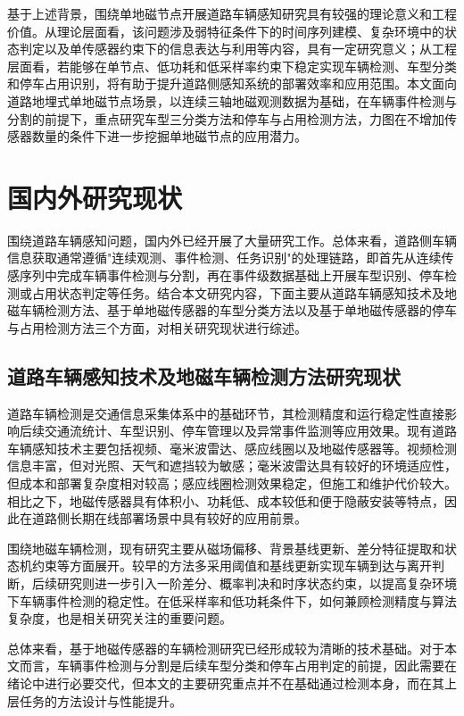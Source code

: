 基于上述背景，围绕单地磁节点开展道路车辆感知研究具有较强的理论意义和工程价值。从理论层面看，该问题涉及弱特征条件下的时间序列建模、复杂环境中的状态判定以及单传感器约束下的信息表达与利用等内容，具有一定研究意义；从工程层面看，若能够在单节点、低功耗和低采样率约束下稳定实现车辆检测、车型分类和停车占用识别，将有助于提升道路侧感知系统的部署效率和应用范围。本文面向道路地埋式单地磁节点场景，以连续三轴地磁观测数据为基础，在车辆事件检测与分割的前提下，重点研究车型三分类方法和停车与占用检测方法，力图在不增加传感器数量的条件下进一步挖掘单地磁节点的应用潜力。


\section{国内外研究现状}
\label{sec:related_work}

围绕道路车辆感知问题，国内外已经开展了大量研究工作。总体来看，道路侧车辆信息获取通常遵循"连续观测、事件检测、任务识别"的处理链路，即首先从连续传感序列中完成车辆事件检测与分割，再在事件级数据基础上开展车型识别、停车检测或占用状态判定等任务。结合本文研究内容，下面主要从道路车辆感知技术及地磁车辆检测方法、基于单地磁传感器的车型分类方法以及基于单地磁传感器的停车与占用检测方法三个方面，对相关研究现状进行综述。

\subsection{道路车辆感知技术及地磁车辆检测方法研究现状}
\label{sec:related_sensor_detection}

道路车辆检测是交通信息采集体系中的基础环节，其检测精度和运行稳定性直接影响后续交通流统计、车型识别、停车管理以及异常事件监测等应用效果。现有道路车辆感知技术主要包括视频、毫米波雷达、感应线圈以及地磁传感器等。视频检测信息丰富，但对光照、天气和遮挡较为敏感；毫米波雷达具有较好的环境适应性，但成本和部署复杂度相对较高；感应线圈检测效果稳定，但施工和维护代价较大。相比之下，地磁传感器具有体积小、功耗低、成本较低和便于隐蔽安装等特点，因此在道路侧长期在线部署场景中具有较好的应用前景。

围绕地磁车辆检测，现有研究主要从磁场偏移、背景基线更新、差分特征提取和状态机约束等方面展开。较早的方法多采用阈值和基线更新实现车辆到达与离开判断，后续研究则进一步引入一阶差分、概率判决和时序状态约束，以提高复杂环境下车辆事件检测的稳定性。在低采样率和低功耗条件下，如何兼顾检测精度与算法复杂度，也是相关研究关注的重要问题。

总体来看，基于地磁传感器的车辆检测研究已经形成较为清晰的技术基础。对于本文而言，车辆事件检测与分割是后续车型分类和停车占用判定的前提，因此需要在绪论中进行必要交代，但本文的主要研究重点并不在基础通过检测本身，而在其上层任务的方法设计与性能提升。

